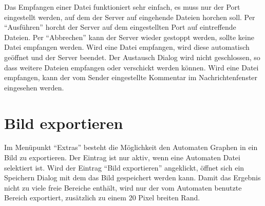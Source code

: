 Das Empfangen einer Datei funktioniert sehr einfach, es muss nur der Port
eingestellt werden, auf dem der Server auf eingehende Dateien horchen soll. Per
"`Ausführen"' horcht der Server auf dem eingestellten Port auf eintreffende
Dateien. Per "`Abbrechen"' kann der Server wieder gestoppt werden, sollte keine
Datei empfangen werden. Wird eine Datei empfangen, wird diese automatisch
geöffnet und der Server beendet. Der Austausch Dialog wird nicht geschlossen, so
dass weitere Dateien empfangen oder verschickt werden können. Wird eine Datei
empfangen, kann der vom Sender eingestellte Kommentar im Nachrichtenfenster
eingesehen werden.


\section{Bild exportieren}

Im Menüpunkt "`Extras"' besteht die Möglichkeit den Automaten Graphen in ein
Bild zu exportieren. Der Eintrag ist nur aktiv, wenn eine Automaten Datei
selektiert ist. Wird der Eintrag "`Bild exportieren"' angeklickt, öffnet sich
ein Speichern Dialog mit dem das Bild gespeichert werden kann. Damit das
Ergebnis nicht zu viele freie Bereiche enthält, wird nur der vom Automaten
benutzte Bereich exportiert, zusätzlich zu einem 20 Pixel breiten Rand.